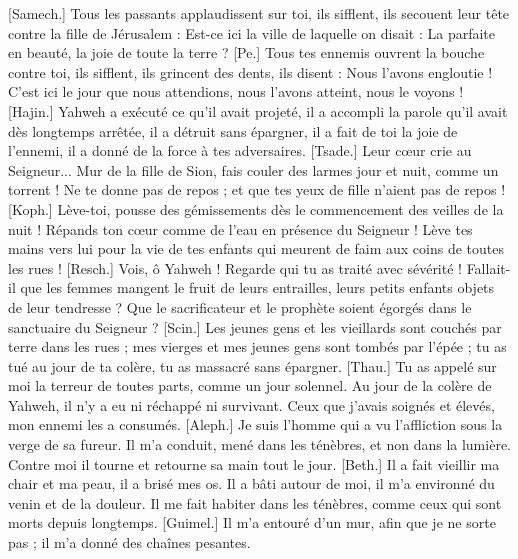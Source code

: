 \begin{multicols}{2}
[Samech.] Tous les passants applaudissent sur toi, ils sifflent, ils secouent leur tête contre la fille de Jérusalem : Est-ce ici la ville de laquelle on disait : La parfaite en beauté, la joie de toute la terre ?
[Pe.] Tous tes ennemis ouvrent la bouche contre toi, ils sifflent, ils grincent des dents, ils disent : Nous l'avons engloutie ! C’est ici le jour que nous attendions, nous l’avons atteint, nous le voyons !
[Hajin.] Yahweh a exécuté ce qu’il avait projeté, il a accompli la parole qu’il avait dès longtemps arrêtée, il a détruit sans épargner, il a fait de toi la joie de l'ennemi, il a donné de la force à tes adversaires.
[Tsade.] Leur cœur crie au Seigneur... Mur de la fille de Sion, fais couler des larmes jour et nuit, comme un torrent ! Ne te donne pas de repos ; et que tes yeux de fille n’aient pas de repos  !
[Koph.] Lève-toi, pousse des gémissements dès le commencement des veilles de la nuit ! Répands ton cœur comme de l’eau en présence du Seigneur ! Lève tes mains vers lui pour la vie de tes enfants qui meurent de faim aux coins de toutes les rues !
[Resch.] Vois, ô Yahweh ! Regarde qui tu as traité avec sévérité ! Fallait-il que les femmes mangent le fruit de leurs entrailles, leurs petits enfants objets de leur tendresse ? Que le sacrificateur et le prophète soient égorgés dans le sanctuaire du Seigneur ?
[Scin.] Les jeunes gens et les vieillards sont couchés par terre dans les rues ; mes vierges et mes jeunes gens sont tombés par l’épée ; tu as tué au jour de ta colère, tu as massacré sans épargner.
[Thau.] Tu as appelé sur moi la terreur de toutes parts, comme un jour solennel. Au jour de la colère de Yahweh, il n'y a eu ni réchappé ni survivant. Ceux que j’avais soignés et élevés, mon ennemi les a consumés.
\VerseOne{}[Aleph.] Je suis l’homme qui a vu l’affliction sous la verge de sa fureur.
Il m’a conduit, mené dans les ténèbres, et non dans la lumière.
Contre moi il tourne et retourne sa main tout le jour.
[Beth.] Il a fait vieillir ma chair et ma peau, il a brisé mes os.
Il a bâti autour de moi, il m’a environné du venin et de la douleur.
Il me fait habiter dans les ténèbres, comme ceux qui sont morts depuis longtemps.
[Guimel.] Il m'a entouré d'un mur, afin que je ne sorte pas ; il m'a donné des chaînes pesantes.

\end{multicols}
